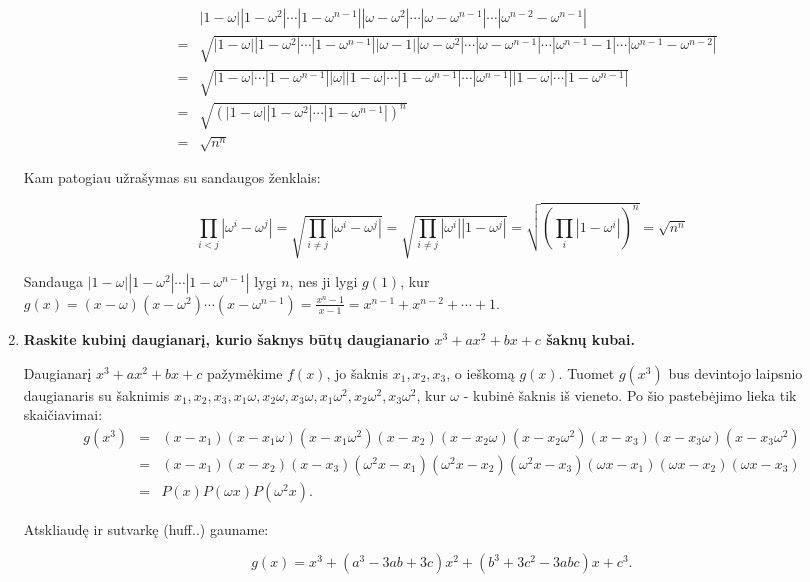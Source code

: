 \begin{enumerate}
\begin{eqnarray*}
& &|1-\omega||1-\omega^2|\cdots|1-\omega^{n-1}||\omega - \omega^2|\cdots|\omega-\omega^{n-1}|\cdots|\omega^{n-2}-\omega^{n-1}|
\\&=& \sqrt{|1-\omega||1-\omega^2|\cdots|1-\omega^{n-1}||\omega - 1||\omega - \omega^2|\cdots|\omega-\omega^{n-1}|\cdots|\omega^{n-1} - 1|\cdots|\omega^{n-1} - \omega^{n-2}|}
\\&=& \sqrt{|1-\omega|\cdots|1-\omega^{n-1}||\omega||1-\omega|\cdots|1-\omega^{n-1}|\cdots|\omega^{n-1}||1-\omega|\cdots|1-\omega^{n-1}|}
\\&=&
\sqrt{(|1-\omega||1-\omega^2|\cdots|1-\omega^{n-1}|)^n}
\\&=& \sqrt{n^n}
\end{eqnarray*}

Kam patogiau užrašymas su sandaugos ženklais:

$$\prod_{i<j}|\omega^i - \omega^j| = \sqrt{\prod_{i\neq j}|\omega^i - \omega^j|} = \sqrt{\prod_{i\neq j}|\omega^i||1 - \omega^j|} = \sqrt{\left(\prod_{i}|1 - \omega^i|\right)^n} = \sqrt{n^n}$$

Sandauga $|1-\omega||1-\omega^2|\cdots|1-\omega^{n-1}|$ lygi $n$, nes ji lygi $g(1)$, kur $g(x) = (x-\omega)(x-\omega^2)\cdots(x-\omega^{n-1}) = \frac{x^n -1}{x-1} = x^{n-1} + x^{n-2} + \cdots + 1.$

\medskip

\item {\bf Raskite kubinį daugianarį, kurio šaknys būtų daugianario $x^3 + ax^2 + bx + c$ šaknų kubai.}

\medskip

Daugianarį $x^3 + ax^2 + bx + c$ pažymėkime $f(x)$, jo šaknis $x_1, x_2, x_3$, o ieškomą $g(x)$. Tuomet $g(x^3)$ bus devintojo laipsnio daugianaris su šaknimis $x_1, x_2, x_3, x_1\omega, x_2\omega, x_3\omega, x_1\omega^2, x_2\omega^2, x_3\omega^2$, kur $\omega$ - kubinė šaknis iš vieneto. Po šio pastebėjimo lieka tik skaičiavimai:
\begin{eqnarray*}
g(x^3) &=& (x-x_1)(x-x_1\omega)(x-x_1\omega^2)(x-x_2)(x-x_2\omega)(x-x_2\omega^2)(x-x_3)(x-x_3\omega)(x-x_3\omega^2)
\\ &=& (x-x_1)(x-x_2)(x-x_3)(\omega^2x-x_1)(\omega^2x-x_2)(\omega^2x-x_3)(\omega x-x_1)(\omega x-x_2)(\omega x-x_3)
\\ &=& P(x)P(\omega x)P(\omega^2x).
\end{eqnarray*}

Atskliaudę ir sutvarkę (huff..) gauname:

$$g(x) = x^3 + (a^3-3ab+3c)x^2 + (b^3+3c^2-3abc)x + c^3.$$


\end{enumerate}
